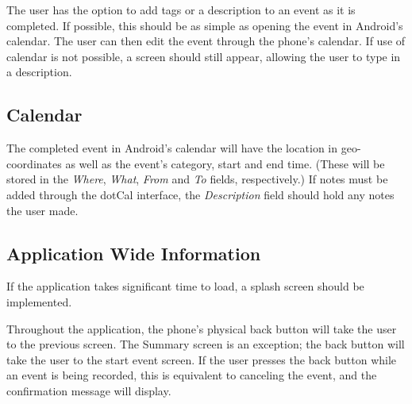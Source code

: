 \documentclass[11pt]{article}
\begin{document}
The user has the option to add tags or a description to an event as it is completed. If possible, this should be as simple as opening the event in Android's calendar. The user can then edit the event through the phone's calendar. If use of calendar is not possible, a screen should still appear, allowing the user to type in a description.

\subsection{Calendar}
The completed event in Android's calendar will have the location in geo-coordinates as well as the event's category, start and end time. (These will be stored in the \emph{Where}, \emph{What}, \emph{From} and \emph{To} fields, respectively.) If notes must be added through the dotCal interface, the \emph{Description} field should hold any notes the user made.

\subsection{Application Wide Information}

If the application takes significant time to load, a splash screen should be implemented.

Throughout the application, the phone's physical back button will take the user to the previous screen. The Summary screen is an exception; the back button will take the user to the start event screen.  If the user presses the back button while an event is being recorded, this is equivalent to canceling the event, and the confirmation message will display.
\end{document}
